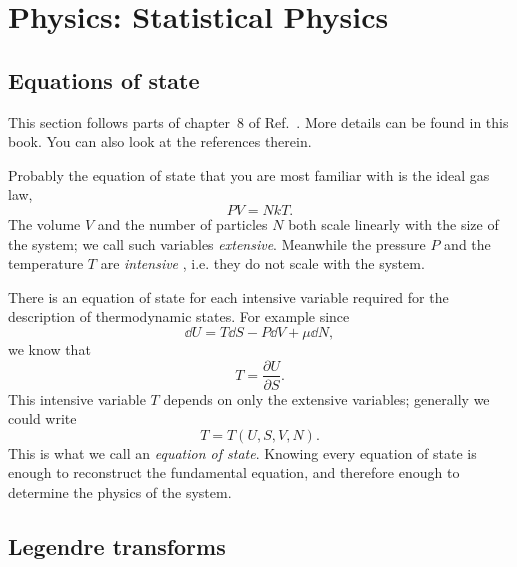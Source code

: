\chapter{Physics: Statistical Physics}


\section{Equations of state}\label{sec:EoS}

This section follows parts of chapter~8 of
Ref.~\cite{tahir-kheli_general_2012}. More details can be found in this 
book. You can also look at the references therein.

Probably the equation of state that you are most familiar with is the 
ideal gas law,
\begin{equation}
  PV=NkT.
\end{equation}
The volume $V$ and the number of particles $N$ both scale linearly with the
size of the system; we call such variables {\it extensive}. 
Meanwhile the pressure $P$ and the temperature $T$ are {\it intensive}
, i.e. they do not scale with the system.

There is an equation of state for each intensive variable required for the
description of thermodynamic states. For example since
\begin{equation}\label{eq:fslaw}
  \dd{U}=T\dd{S}-P\dd{V}+\mu\dd{N},
\end{equation}
we know that
\begin{equation}
  T=\frac{\partial U}{\partial S}.
\end{equation}
This intensive variable $T$ depends on only the extensive variables; 
generally we could write
\begin{equation}
  T=T(U,S,V,N).
\end{equation}
This is what we call an {\it equation of state}. 
Knowing every equation 
of state is enough to reconstruct the fundamental equation, and therefore 
enough to determine the physics of the system.

\section{Legendre transforms}

